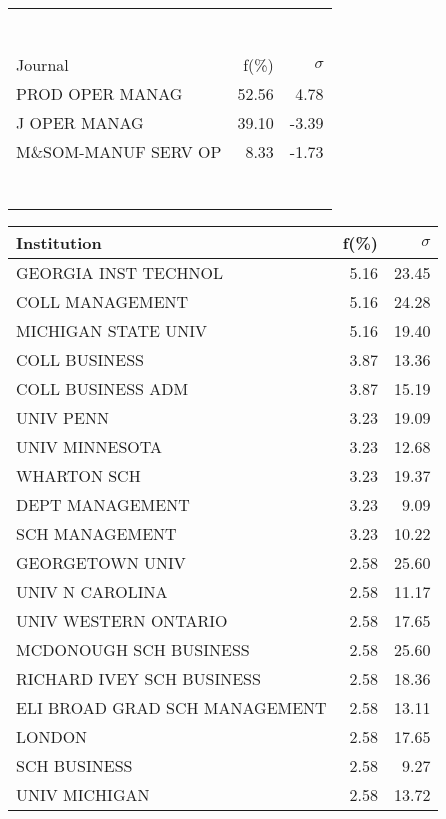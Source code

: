 \documentclass[a4paper,11pt]{report}
\begin{document}
\begin{landscape}
\begin{table}[!ht]
{\begin{tabular}{|l r  r|}
 &  & \\
 &  & \\
 &  & \\
 &  & \\
 &  & \\
 &  & \\
 &  & \\
\hline
\hline
Journal & f(\%) & $\sigma$\\
\hline
PROD OPER MANAG & 52.56 & 4.78\\
J OPER MANAG & 39.10 & -3.39\\
M\&SOM-MANUF SERV OP & 8.33 & -1.73\\
 &  & \\
 &  & \\
 &  & \\
 &  & \\
 &  & \\
 &  & \\
 &  & \\
\hline
\end{tabular}
}
{\scriptsize\begin{tabular}{|l r r|}
\hline
Institution & f(\%) & $\sigma$\\
\hline
GEORGIA INST TECHNOL & 5.16 & 23.45\\
COLL MANAGEMENT & 5.16 & 24.28\\
MICHIGAN STATE UNIV & 5.16 & 19.40\\
COLL BUSINESS & 3.87 & 13.36\\
COLL BUSINESS ADM & 3.87 & 15.19\\
UNIV PENN & 3.23 & 19.09\\
UNIV MINNESOTA & 3.23 & 12.68\\
WHARTON SCH & 3.23 & 19.37\\
DEPT MANAGEMENT & 3.23 & 9.09\\
SCH MANAGEMENT & 3.23 & 10.22\\
GEORGETOWN UNIV & 2.58 & 25.60\\
UNIV N CAROLINA & 2.58 & 11.17\\
UNIV WESTERN ONTARIO & 2.58 & 17.65\\
MCDONOUGH SCH BUSINESS & 2.58 & 25.60\\
RICHARD IVEY SCH BUSINESS & 2.58 & 18.36\\
ELI BROAD GRAD SCH MANAGEMENT & 2.58 & 13.11\\
LONDON & 2.58 & 17.65\\
SCH BUSINESS & 2.58 & 9.27\\
UNIV MICHIGAN & 2.58 & 13.72\\

\end{tabular}}
\end{table}
\end{landscape}
\end{document}
